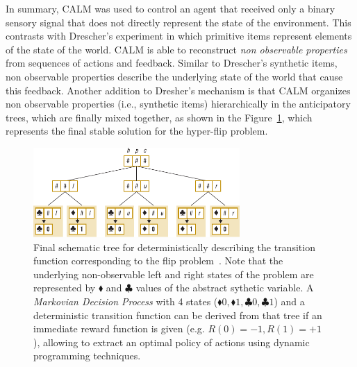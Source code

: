 \documentclass[runningheads]{llncs}
\begin{document}
In summary, CALM was used to control an agent that received only a binary sensory signal that does not directly represent the state of the environment.
This contrasts with Drescher's experiment in which primitive items represent elements of the state of the world. 
CALM is able to reconstruct \textit{non observable properties} from sequences of actions and feedback.
Similar to Drescher's synthetic items, non observable properties describe the underlying state of the world that cause this feedback. 
Another addition to Dresher's mechanism is that CALM organizes non observable properties (i.e., synthetic items) hierarchically in the anticipatory trees, which are finally mixed together, as shown in the Figure~\ref{fig:perotto_tree}, which represents the final stable solution for the hyper-flip problem.

\begin{figure}
	\centering
	\includegraphics[width=0.7\textwidth]{Figure_8_CALM_tree.pdf}
	\caption{Final schematic tree for deterministically describing the transition function corresponding to the flip problem~\cite{Perotto:2013:CF}. Note that the underlying non-observable left and right states of the problem are represented by $\blacklozenge$ and $\clubsuit$ values of the abstract sythetic variable. A \textit{Markovian Decision Process} with 4 states ($\blacklozenge 0, \blacklozenge 1, \clubsuit 0, \clubsuit 1$) and a deterministic transition function can be derived from that tree if an immediate reward function is given (e.g. $R(0) = -1, R(1) = +1$), allowing to extract an optimal policy of actions using dynamic programming techniques.} 
	\label{fig:perotto_tree}
\end{figure}


\end{document}
